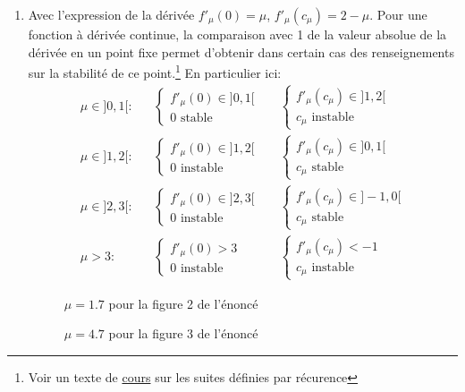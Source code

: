 \begin{enumerate}
 \item Avec l'expression de la dérivée $f'_\mu(0)=\mu$,  $f'_\mu(c_\mu)=2-\mu$.\newline 
Pour une fonction à dérivée continue, la comparaison avec 1 de la valeur absolue de la dérivée en un point fixe permet d'obtenir dans certain cas des renseignements sur la stabilité de ce point.\footnote{Voir un texte de \href{http://back.maquisdoc.net/data/cours_nicolair/C4792.pdf}{cours} sur les suites définies par récurence} En particulier ici:
\begin{align*}
 &\mu\in ]0,1[ :& 
 &\left\lbrace \begin{aligned}
  f'_\mu(0)\in ]0,1[\\
  0 \text{ stable}
 \end{aligned} \right.&  
 &\left\lbrace \begin{aligned}
  f'_\mu(c_\mu)\in ]1,2[\\
  c_\mu \text{ instable}
 \end{aligned} \right.& \\
 &\mu\in ]1,2[ :& 
&\left\lbrace \begin{aligned}
  f'_\mu(0)\in ]1,2[\\
  0 \text{ instable}
 \end{aligned} \right.& 
&\left\lbrace  \begin{aligned}
  f'_\mu(c_\mu)\in ]0,1[\\
  c_\mu \text{ stable}
 \end{aligned} \right.& \\
 &\mu\in ]2,3[ :& 
&\left\lbrace \begin{aligned}
  f'_\mu(0)\in ]2,3[\\
  0 \text{ instable}
 \end{aligned} \right.& 
&\left\lbrace \begin{aligned}
  f'_\mu(c_\mu)\in ]-1,0[\\
  c_\mu \text{ stable}
 \end{aligned} \right.& \\
 &\mu > 3 :& 
&\left\lbrace \begin{aligned}
  f'_\mu(0)>3 \\
  0 \text{ instable}
 \end{aligned} \right.& 
&\left\lbrace \begin{aligned}
  f'_\mu(c_\mu)<-1 \\
  c_\mu \text{ instable}
 \end{aligned} \right.&
\end{align*}
\begin{figure}[ht]
 \centering
 
 \caption{$\mu=1.7$ pour la figure 2 de l'énoncé}
 \label{fig:Clogistic_1}
\end{figure}
\begin{figure}[ht]
 \centering
 
 \caption{$\mu=4.7$ pour la figure 3 de l'énoncé}
 \label{fig:Clogistic_2}
\end{figure}


\end{enumerate}
